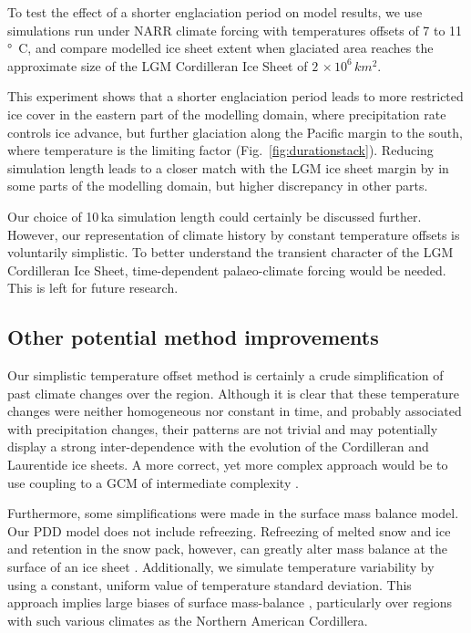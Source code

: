 To test the effect of a shorter englaciation period on model results, we use simulations run under NARR climate forcing with temperatures offsets of 7 to 11\,\unit{\degree C}, and compare modelled ice sheet extent when glaciated area reaches the approximate size of the LGM Cordilleran Ice Sheet of $2\,\times10^6\,\unit{km^2}$.

This experiment shows that a shorter englaciation period leads to more restricted ice cover in the eastern part of the modelling domain, where precipitation rate controls ice advance, but further glaciation along the Pacific margin to the south, where temperature is the limiting factor (Fig.~\ref{fig:durationstack}). Reducing simulation length leads to a closer match with the LGM ice sheet margin by \citet{dyke-2004} in some parts of the modelling domain, but higher discrepancy in other parts.

Our choice of 10\,ka simulation length could certainly be discussed further. However, our representation of climate history by constant temperature offsets is voluntarily simplistic. To better understand the transient character of the LGM Cordilleran Ice Sheet, time-dependent palaeo-climate forcing would be needed. This is left for future research.

\subsection{Other potential method improvements}

Our simplistic temperature offset method is certainly a crude simplification of past climate changes over the region. Although it is clear that these temperature changes were neither homogeneous nor constant in time, and probably associated with precipitation changes, their patterns are not trivial and may potentially display a strong inter-dependence with the evolution of the Cordilleran and Laurentide ice sheets. A more correct, yet more complex approach would be to use coupling to a GCM of intermediate complexity \citep{yoshimori-etal-2001,calov-etal-2002,abeouchi-etal-2007,charbit-etal-2013}.

Furthermore, some simplifications were made in the surface mass balance model. Our PDD model does not include refreezing. Refreezing of melted snow and ice and retention in the snow pack, however, can greatly alter mass balance at the surface of an ice sheet \citep{janssens-huybrechts-2000}. Additionally, we simulate temperature variability by using a constant, uniform value of temperature standard deviation. This approach implies large biases of surface mass-balance \citep{charbit-etal-2013,rau-rogozhina-2013,seguinot-inpress}, particularly over regions with such various climates as the Northern American Cordillera.

